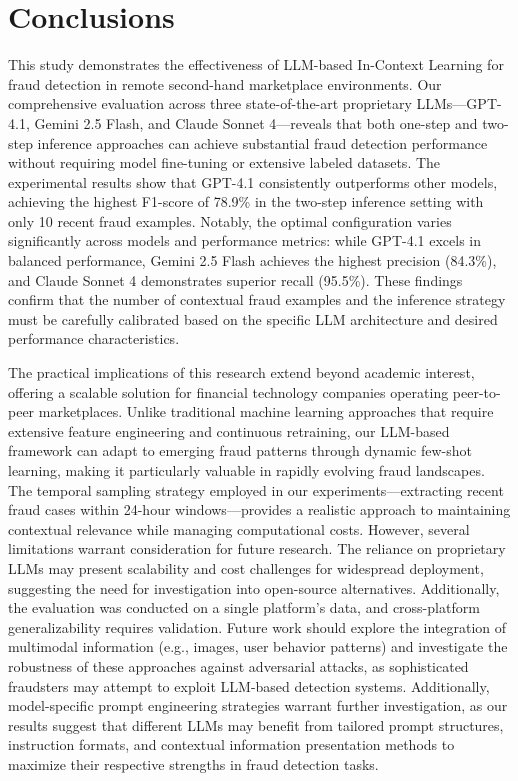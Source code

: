 \documentclass[sigconf]{acmart}
\begin{document}
\section{Conclusions}\label{conclusions}
This study demonstrates the effectiveness of LLM-based In-Context Learning for fraud detection in remote second-hand marketplace environments. Our comprehensive evaluation across three state-of-the-art proprietary LLMs—GPT-4.1, Gemini 2.5 Flash, and Claude Sonnet 4—reveals that both one-step and two-step inference approaches can achieve substantial fraud detection performance without requiring model fine-tuning or extensive labeled datasets. The experimental results show that GPT-4.1 consistently outperforms other models, achieving the highest F1-score of 78.9\% in the two-step inference setting with only 10 recent fraud examples. Notably, the optimal configuration varies significantly across models and performance metrics: while GPT-4.1 excels in balanced performance, Gemini 2.5 Flash achieves the highest precision (84.3\%), and Claude Sonnet 4 demonstrates superior recall (95.5\%). These findings confirm that the number of contextual fraud examples and the inference strategy must be carefully calibrated based on the specific LLM architecture and desired performance characteristics.

The practical implications of this research extend beyond academic interest, offering a scalable solution for financial technology companies operating peer-to-peer marketplaces. Unlike traditional machine learning approaches that require extensive feature engineering and continuous retraining, our LLM-based framework can adapt to emerging fraud patterns through dynamic few-shot learning, making it particularly valuable in rapidly evolving fraud landscapes. The temporal sampling strategy employed in our experiments—extracting recent fraud cases within 24-hour windows—provides a realistic approach to maintaining contextual relevance while managing computational costs. However, several limitations warrant consideration for future research. The reliance on proprietary LLMs may present scalability and cost challenges for widespread deployment, suggesting the need for investigation into open-source alternatives. Additionally, the evaluation was conducted on a single platform's data, and cross-platform generalizability requires validation. Future work should explore the integration of multimodal information (e.g., images, user behavior patterns) and investigate the robustness of these approaches against adversarial attacks, as sophisticated fraudsters may attempt to exploit LLM-based detection systems. Additionally, model-specific prompt engineering strategies warrant further investigation, as our results suggest that different LLMs may benefit from tailored prompt structures, instruction formats, and contextual information presentation methods to maximize their respective strengths in fraud detection tasks.





 
\end{document}
